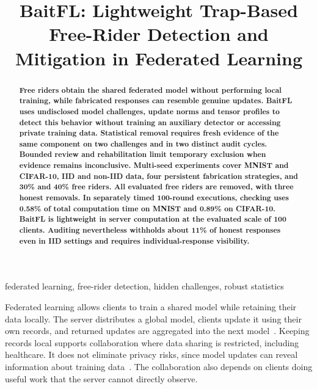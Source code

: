 \documentclass[conference]{IEEEtran}
\title{BaitFL: Lightweight Trap-Based Free-Rider Detection and Mitigation in Federated Learning}
\author{\IEEEauthorblockN{Aashnan Rahman}
\IEEEauthorblockA{Department of Computer Science and Engineering\\Islamic University of Technology}}
\makeatletter
\renewcommand{\section}{\@startsection{section}{1}{\z@}{1.5ex}{0.7ex}{\normalfont\normalsize\centering\scshape}}
\makeatother
\begin{document}
\maketitle
\raggedbottom
\setlength{\parskip}{0pt plus 2pt minus 0.5pt}
\makeatletter{}\makeatother
\setlength{\abovedisplayskip}{6pt plus 1pt minus 1pt}
\setlength{\belowdisplayskip}{6pt plus 1pt minus 1pt}
\begin{abstract}\bfseries
Free riders obtain the shared federated model without performing local
training, while fabricated responses can resemble genuine updates.
BaitFL uses undisclosed model challenges, update norms and tensor profiles
to detect this behavior without training an auxiliary detector or accessing
private training data. Statistical removal requires fresh evidence of the
same component on two challenges and in two distinct audit cycles.
Bounded review and rehabilitation limit temporary exclusion when evidence
remains inconclusive. Multi-seed experiments cover MNIST and CIFAR-10,
IID and non-IID data, four persistent fabrication strategies, and 30\%
and 40\% free riders. All evaluated free riders are removed, with three
honest removals. In separately timed 100-round executions, checking uses
0.58\% of total computation time on MNIST and 0.89\% on CIFAR-10.
BaitFL is lightweight in server computation at the evaluated scale of
100 clients. Auditing nevertheless withholds about 11\% of honest
responses even in IID settings and requires individual-response visibility.
\end{abstract}
\begin{IEEEkeywords}
federated learning, free-rider detection, hidden challenges, robust statistics
\end{IEEEkeywords}

\section{Introduction}
Federated learning allows clients to train a shared model while retaining
their data locally. The server distributes a global model, clients update
it using their own records, and returned updates are aggregated into the
next model~\cite{mcmahan2017communication}. Keeping records local supports
collaboration where data sharing is restricted, including healthcare.
It does not eliminate privacy risks, since model updates can reveal
information about training data~\cite{kairouz2021advances,melis2019leakage}.
The collaboration also depends on clients doing useful work that the
server cannot directly observe.
\end{document}
